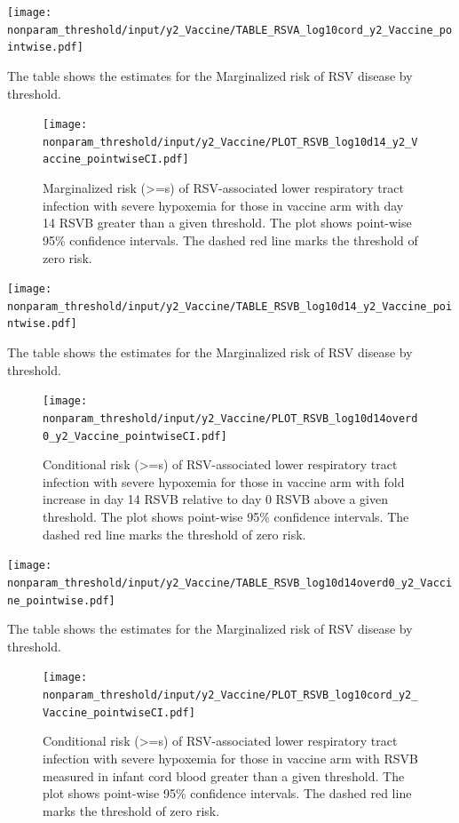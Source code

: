 \documentclass[11pt]{article}
\begin{document}
\begin{table}[H]
    \centering
    \texttt{[image: nonparam\_threshold/input/y2\_Vaccine/TABLE\_RSVA\_log10cord\_y2\_Vaccine\_pointwise.pdf]}
    \caption{The table shows the  estimates for the Marginalized risk of RSV disease by threshold. }
\end{table}

\begin{figure}[H]
    \centering
    \texttt{[image: nonparam\_threshold/input/y2\_Vaccine/PLOT\_RSVB\_log10d14\_y2\_Vaccine\_pointwiseCI.pdf]}
   \caption{Marginalized risk (>=s) of RSV-associated lower respiratory tract infection with severe hypoxemia for those in vaccine arm with day 14 RSVB greater than a given threshold. The plot shows point-wise 95\% confidence intervals. The dashed red line marks the threshold of zero risk.}
\end{figure}

\begin{table}[H]
    \centering
    \texttt{[image: nonparam\_threshold/input/y2\_Vaccine/TABLE\_RSVB\_log10d14\_y2\_Vaccine\_pointwise.pdf]}
    \caption{The table shows the  estimates for the Marginalized risk of RSV disease by threshold. }
\end{table}

\begin{figure}[H]
    \centering
    \texttt{[image: nonparam\_threshold/input/y2\_Vaccine/PLOT\_RSVB\_log10d14overd0\_y2\_Vaccine\_pointwiseCI.pdf]}
    \caption{Conditional risk (>=s) of RSV-associated lower respiratory tract infection with severe hypoxemia for those in vaccine arm with fold increase in day 14 RSVB relative to day 0 RSVB above a given threshold. The plot shows point-wise 95\% confidence intervals. The dashed red line marks the threshold of zero risk.}
\end{figure}

\begin{table}[H]
    \centering
    \texttt{[image: nonparam\_threshold/input/y2\_Vaccine/TABLE\_RSVB\_log10d14overd0\_y2\_Vaccine\_pointwise.pdf]}
    \caption{The table shows the  estimates for the Marginalized risk of RSV disease by threshold. }
\end{table}

\begin{figure}[H]
    \centering
    \texttt{[image: nonparam\_threshold/input/y2\_Vaccine/PLOT\_RSVB\_log10cord\_y2\_Vaccine\_pointwiseCI.pdf]}
   \caption{Conditional risk (>=s) of RSV-associated lower respiratory tract infection with severe hypoxemia for those in vaccine arm with RSVB measured in infant cord blood greater than a given threshold. The plot shows point-wise 95\% confidence intervals. The dashed red line marks the threshold of zero risk.}
\end{figure}
\end{document}
